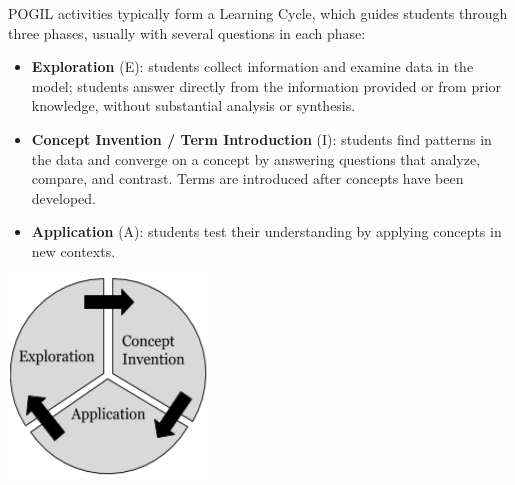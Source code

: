 

POGIL activities typically form a Learning Cycle, which guides students through three phases, usually with several questions in each phase:

\vspace{1em}

\begin{minipage}{0.68\linewidth}
\begin{itemize}

\item \textbf{Exploration} (E): students collect information and examine data in the model; students answer directly from the information provided or from prior knowledge, without substantial analysis or synthesis.

\item \textbf{Concept Invention / Term Introduction} (I): students find patterns in the data and converge on a concept by answering questions that analyze, compare, and contrast. Terms are introduced after concepts have been developed.

\item \textbf{Application} (A): students test their understanding by applying concepts in new contexts.

\end{itemize}
\end{minipage}
\hfill
\begin{minipage}{0.30\linewidth}
\includegraphics[width=\linewidth]{learning-cycle.png}
\end{minipage}


